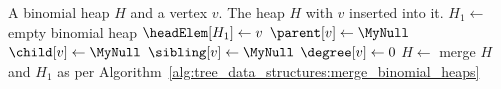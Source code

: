 
\begin{algorithmic}[1]
\Require A binomial heap $H$ and a vertex $v$.
\Ensure The heap $H$ with $v$ inserted into it.
\State $H_1 \gets$ empty binomial heap
\State $\headElem[H_1] \gets v$
\State $\parent[v] \gets \MyNull$
\State $\child[v] \gets \MyNull$
\State $\sibling[v] \gets \MyNull$
\State $\degree[v] \gets 0$
\State $H \gets$ merge $H$ and $H_1$ as per Algorithm~\ref{alg:tree_data_structures:merge_binomial_heaps}
\end{algorithmic}
